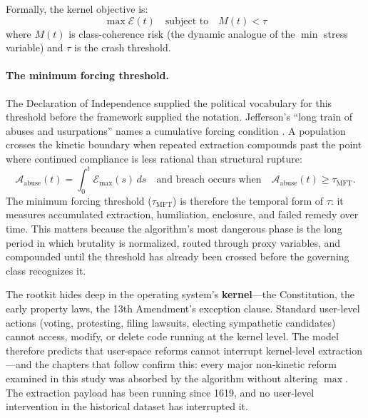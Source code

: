 Formally, the kernel objective is:
\begin{equation}\label{eq:1.5-kernel-optimization}
\max \mathcal{E}(t) \quad \text{subject to} \quad M(t) < \tau
\end{equation}
where $M(t)$ is class-coherence risk (the dynamic analogue of the $\min$ stress variable) and $\tau$ is the crash threshold.

\paragraph{The minimum forcing threshold.}
The Declaration of Independence supplied the political vocabulary for this threshold before the framework supplied the notation. Jefferson's ``long train of abuses and usurpations'' names a cumulative forcing condition \cite{declaration_independence_1776}. A population crosses the kinetic boundary when repeated extraction compounds past the point where continued compliance is less rational than structural rupture:
\begin{equation}\label{eq:1.5a-minimum-forcing-threshold}
\mathcal{A}_{\text{abuse}}(t)
=
\int_{0}^{t} \mathcal{E}_{\max}(s)\,ds
\quad \text{and breach occurs when} \quad
\mathcal{A}_{\text{abuse}}(t) \geq \tau_{\text{MFT}} .
\end{equation}
The minimum forcing threshold ($\tau_{\text{MFT}}$) is therefore the temporal form of $\tau$: it measures accumulated extraction, humiliation, enclosure, and failed remedy over time. This matters because the algorithm's most dangerous phase is the long period in which brutality is normalized, routed through proxy variables, and compounded until the threshold has already been crossed before the governing class recognizes it.

The rootkit hides deep in the operating system's \textbf{kernel}---the Constitution, the early property laws, the 13th Amendment's exception clause. Standard user-level actions (voting, protesting, filing lawsuits, electing sympathetic candidates) cannot access, modify, or delete code running at the kernel level. The model therefore predicts that user-space reforms cannot interrupt kernel-level extraction---and the chapters that follow confirm this: every major non-kinetic reform examined in this study was absorbed by the algorithm without altering $\max$. The extraction payload has been running since 1619, and no user-level intervention in the historical dataset has interrupted it.

